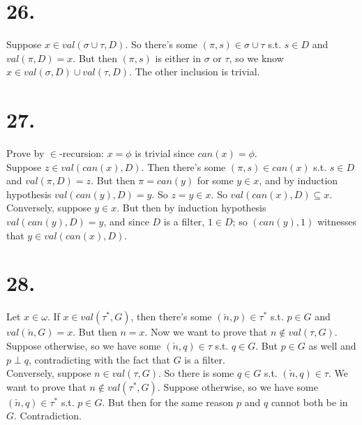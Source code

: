 \documentclass[a4paper]{article}
\begin{document}
\section*{26.}
Suppose $x \in val(\sigma \cup \tau,D)$. So there's some $(\pi,s) \in \sigma \cup \tau$ s.t. $s \in D$ and $val(\pi,D) = x$. But then $(\pi,s)$ is either in $\sigma$ or $\tau$, so we know $x \in val(\sigma,D) \cup val(\tau,D)$. The other inclusion is trivial.

\section*{27.}
Prove by $\in$-recursion: $x=\phi$ is trivial since $can(x) = \phi$. \\
Suppose $z \in val(can(x),D)$. Then there's some $(\pi,s) \in can(x)$ s.t. $s \in D$ and $val(\pi,D) = z$. But then $\pi = can(y)$ for some $y \in x$, and by induction hypothesis $val(can(y),D) = y$. So $z=y\in x$. So $val(can(x),D) \subseteq x$.\\
Conversely, suppose $y \in x$. But then by induction hypothesis $val(can(y),D) = y$, and since $D$ is a filter, $1 \in D$; so $(can(y),1)$ witnesses that $y \in val(can(x),D)$.

\section*{28.}
Let $x \in \omega$. If $x \in val(\tau^*,G)$, then there's some $(\check{n},p) \in \tau^*$ s.t. $p \in G$ and $val(\check{n},G) = x$. But then $n=x$. Now we want to prove that $n \not\in val(\tau,G)$. Suppose otherwise, so we have some $(\check{n},q) \in \tau$ s.t. $q \in G$. But $p \in G$ as well and $p \perp q$, contradicting with the fact that $G$ is a filter.\\
Conversely, suppose $n \in val(\tau,G)$. So there is some $q \in G$ s.t. $(\check{n},q) \in \tau$. We want to prove that $n \not\in val(\tau^*,G)$. Suppose otherwise, so we have some $(\check{n},q) \in \tau^*$ s.t. $p \in G$. But then for the same reason $p$ and $q$ cannot both be in $G$. Contradiction.
\end{document}
